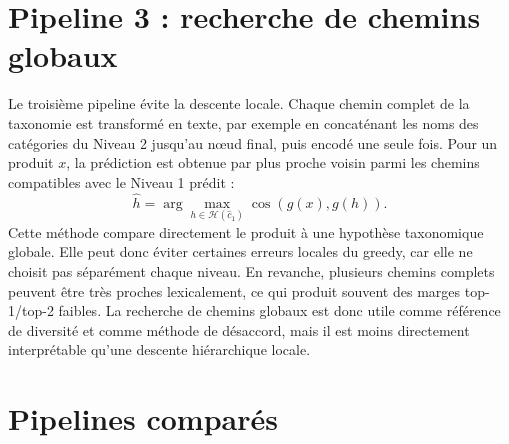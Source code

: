 \documentclass[12pt,a4paper]{report}
\begin{document}
\section{Pipeline 3 : recherche de chemins globaux}
\label{sec:l2-l7-pipeline3-global-path-main}

Le troisième pipeline évite la descente locale. Chaque chemin complet de la taxonomie est transformé en texte, par exemple en concaténant les noms des catégories du Niveau 2 jusqu'au nœud final, puis encodé une seule fois. Pour un produit $x$, la prédiction est obtenue par plus proche voisin parmi les chemins compatibles avec le Niveau 1 prédit :
\begin{equation}
    \hat{h}
    =
    \arg\max_{h\in\mathcal{H}(\hat{c}_1)}
    \cos(g(x),g(h)).
\end{equation}
Cette méthode compare directement le produit à une hypothèse taxonomique globale. Elle peut donc éviter certaines erreurs locales du greedy, car elle ne choisit pas séparément chaque niveau. En revanche, plusieurs chemins complets peuvent être très proches lexicalement, ce qui produit souvent des marges top-1/top-2 faibles. La recherche de chemins globaux est donc utile comme référence de diversité et comme méthode de désaccord, mais il est moins directement interprétable qu'une descente hiérarchique locale.


\section{Pipelines comparés}
\label{sec:l2-l7-pipeline-local-decoding}
\label{sec:l2-l7-pipeline-clustering}
\label{sec:l2-l7-pipeline-global-path}
\end{document}
